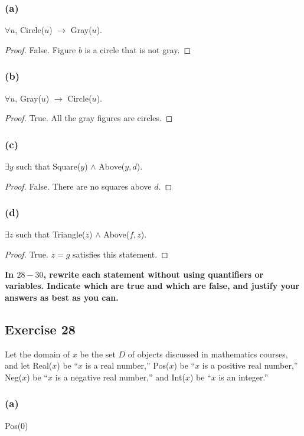 \documentclass[14pt]{extarticle}
\newcommand{\fa}{\forall}
\newcommand{\te}{\exists}
\begin{document}
\subsubsection{(a)}
$\fa u$, Circle($u$) $\to$ Gray($u$).

\begin{proof}
False. Figure $b$ is a circle that is not gray.
\end{proof}

\subsubsection{(b)}
$\fa u$, Gray($u$) $\to$ Circle($u$).

\begin{proof}
True. All the gray figures are circles.
\end{proof}

\subsubsection{(c)}
$\te y$ such that Square($y$) $\wedge$ Above($y, d$).

\begin{proof}
False. There are no squares above $d$.
\end{proof}

\subsubsection{(d)}
$\te z$ such that Triangle($z$) $\wedge$ Above($f, z$).

\begin{proof}
True. $z = g$ satisfies this statement.
\end{proof}

{\bf \color{cyan} In $28-30$, rewrite each statement without using quantifiers or variables. Indicate which are true and which are false, and justify your answers as best as you can.}

\subsection{Exercise 28}
Let the domain of $x$ be the set $D$ of objects discussed in mathematics courses, and let Real($x$) be “$x$ is a real number,” Pos($x$) be “$x$ is a positive real number,” Neg($x$) be “$x$ is a negative real number,” and Int($x$) be “$x$ is an integer.”

\subsubsection{(a)}
Pos(0)
\end{document}
